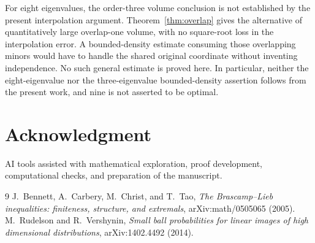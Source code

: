 \documentclass[11pt]{article}
\numberwithin{equation}{section}
\theoremstyle{definition}\newtheorem{definition}[theorem]{Definition}
\theoremstyle{remark}\newtheorem{remark}[theorem]{Remark}
\newcommand{\1}{\mathbf 1}\newcommand{\diag}{\operatorname{diag}}
\begin{document}
For eight eigenvalues, the order-three volume conclusion is not established by the present interpolation argument. Theorem~\ref{thm:overlap} gives the alternative of quantitatively large overlap-one volume, with no square-root loss in the interpolation error. A bounded-density estimate consuming those overlapping minors would have to handle the shared original coordinate without inventing independence. No such general estimate is proved here. In particular, neither the eight-eigenvalue nor the three-eigenvalue bounded-density assertion follows from the present work, and nine is not asserted to be optimal.

\section*{Acknowledgment}
AI tools assisted with mathematical exploration, proof development, computational checks, and preparation of the manuscript.

\begin{thebibliography}{9}
 J.~Bennett, A.~Carbery, M.~Christ, and T.~Tao,
\emph{The Brascamp--Lieb inequalities: finiteness, structure, and extremals},
arXiv:math/0505065 (2005).
 M.~Rudelson and R.~Vershynin,
\emph{Small ball probabilities for linear images of high dimensional distributions},
arXiv:1402.4492 (2014).
\end{thebibliography}
\end{document}
